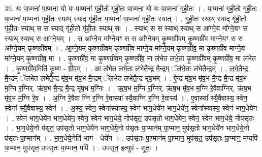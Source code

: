 \documentclass[17pt]{extarticle}
\begin{document}
39. यः पा॒प्मना॑ पा॒प्मना॒ यो यः पा॒प्मना॑ गृही॒तो गृ॑ही॒तः पा॒प्मना॒ यो यः पा॒प्मना॑ गृही॒तः । . पा॒प्मना॑ गृही॒तो गृ॑ही॒तः पा॒प्मना॑ पा॒प्मना॑ गृही॒तः स्याथ् स्याद् गृ॑ही॒तः पा॒प्मना॑ पा॒प्मना॑ गृही॒तः स्यात् । . गृ॒ही॒तः स्याथ् स्याद् गृ॑ही॒तो गृ॑ही॒तः स्याथ् स स स्याद् गृ॑ही॒तो गृ॑ही॒तः स्याथ् सः । . स्याथ् स स स्याथ् स्याथ् स आ᳚ग्ने॒य मा᳚ग्ने॒यꣳ स स्याथ् स्याथ् स आ᳚ग्ने॒यम् । . स आ᳚ग्ने॒य मा᳚ग्ने॒यꣳ स स आ᳚ग्ने॒यम् कृ॒ष्णग्री॑वम् कृ॒ष्णग्री॑व माग्ने॒यꣳ स स आ᳚ग्ने॒यम् कृ॒ष्णग्री॑वम् । . आ॒ग्ने॒यम् कृ॒ष्णग्री॑वम् कृ॒ष्णग्री॑व माग्ने॒य मा᳚ग्ने॒यम् कृ॒ष्णग्री॑व॒ मा कृ॒ष्णग्री॑व माग्ने॒य मा᳚ग्ने॒यम् कृ॒ष्णग्री॑व॒ मा । . कृ॒ष्णग्री॑व॒ मा कृ॒ष्णग्री॑वम् कृ॒ष्णग्री॑व॒ मा ल॑भेत लभे॒ता कृ॒ष्णग्री॑वम् कृ॒ष्णग्री॑व॒ मा ल॑भेत । . कृ॒ष्णग्री॑व॒मिति॑ कृ॒ष्ण - ग्री॒व॒म् । . आ ल॑भेत लभे॒ता ल॑भेतै॒न्द्र मै॒न्द्रम् ॅल॑भे॒ता ल॑भेतै॒न्द्रम् । . ल॒भे॒तै॒न्द्र मै॒न्द्रम् ॅल॑भेत लभेतै॒न्द्र मृ॑ष॒भ मृ॑ष॒भ मै॒न्द्रम् ॅल॑भेत लभेतै॒न्द्र मृ॑ष॒भम् । . ऐ॒न्द्र मृ॑ष॒भ मृ॑ष॒भ मै॒न्द्र मै॒न्द्र मृ॑ष॒भ म॒ग्नि र॒ग्निर्. ऋ॑ष॒भ मै॒न्द्र मै॒न्द्र मृ॑ष॒भ म॒ग्निः । . ऋ॒ष॒भ म॒ग्नि र॒ग्निर्. ऋ॑ष॒भ मृ॑ष॒भ म॒ग्नि रे॒वैवाग्निर्. ऋ॑ष॒भ मृ॑ष॒भ म॒ग्नि रे॒व । . अ॒ग्नि रे॒वैवा ग्नि र॒ग्नि रे॒वास्या᳚ स्यै॒वाग्नि र॒ग्नि रे॒वास्य॑ । . ए॒वास्या᳚ स्यै॒वैवास्य॒ स्वेन॒ स्वेना᳚ स्यै॒वैवास्य॒ स्वेन॑ । . अ॒स्य॒ स्वेन॒ स्वेना᳚स्यास्य॒ स्वेन॑ भाग॒धेये॑न भाग॒धेये॑न॒ स्वेना᳚स्यास्य॒ स्वेन॑ भाग॒धेये॑न । . स्वेन॑ भाग॒धेये॑न भाग॒धेये॑न॒ स्वेन॒ स्वेन॑ भाग॒धेये॒ नोप॑सृत॒ उप॑सृतो भाग॒धेये॑न॒ स्वेन॒ स्वेन॑ भाग॒धेये॒ नोप॑सृतः । . भा॒ग॒धेये॒नो प॑सृत॒ उप॑सृतो भाग॒धेये॑न भाग॒धेये॒नो प॑सृतः पा॒प्मान॑म् पा॒प्मान॒ मुप॑सृतो भाग॒धेये॑न भाग॒धेये॒नो प॑सृतः पा॒प्मान᳚म् । . भा॒ग॒धेये॒नेति॑ भाग - धेये॑न । . उप॑सृतः पा॒प्मान॑म् पा॒प्मान॒ मुप॑सृत॒ उप॑सृतः पा॒प्मान॒ मप्यपि॑ पा॒प्मान॒ मुप॑सृत॒ उप॑सृतः पा॒प्मान॒ मपि॑ । . उप॑सृत॒ इत्युप॑ - सृ॒तः॒ । \newline
\pagebreak
{}
\end{document}
